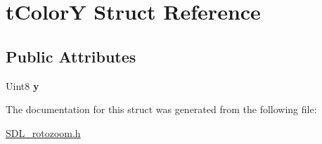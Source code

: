 \hypertarget{structtColorY}{}\section{t\+ColorY Struct Reference}
\label{structtColorY}
\subsection*{Public Attributes}
\begin{DoxyCompactItemize}
\item 
Uint8 {\bfseries y}\hypertarget{structtColorY_a5bfc0bfa51aa91262c1f0dc59c2092a0}{}\label{structtColorY_a5bfc0bfa51aa91262c1f0dc59c2092a0}

\end{DoxyCompactItemize}


The documentation for this struct was generated from the following file\+:\begin{DoxyCompactItemize}
\item 
\hyperlink{SDL__rotozoom_8h}{S\+D\+L\+\_\+rotozoom.\+h}\end{DoxyCompactItemize}
